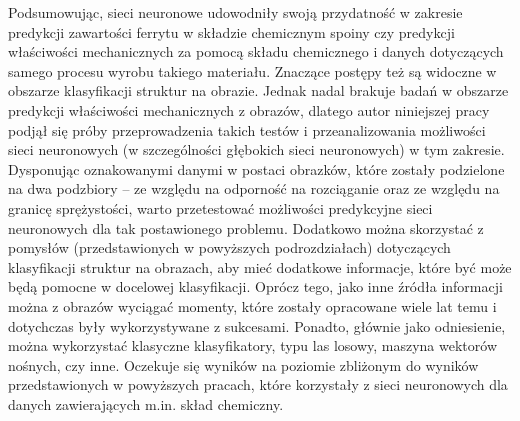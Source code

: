Podsumowując, sieci neuronowe udowodniły swoją przydatność w zakresie predykcji zawartości ferrytu w składzie chemicznym spoiny czy predykcji właściwości mechanicznych za pomocą składu chemicznego i danych dotyczących samego procesu wyrobu takiego materiału. Znaczące postępy też są widoczne w obszarze klasyfikacji struktur na obrazie. Jednak nadal brakuje badań w obszarze predykcji właściwości mechanicznych z obrazów, dlatego autor niniejszej pracy podjął się próby przeprowadzenia takich testów i przeanalizowania możliwości sieci neuronowych (w szczególności głębokich sieci neuronowych) w tym zakresie. Dysponując oznakowanymi danymi w postaci obrazków, które zostały podzielone na dwa podzbiory –  ze względu na odporność na rozciąganie oraz ze względu na granicę sprężystości, warto przetestować możliwości predykcyjne sieci neuronowych dla tak postawionego problemu. Dodatkowo można skorzystać z pomysłów (przedstawionych w powyższych podrozdziałach) dotyczących klasyfikacji struktur na obrazach, aby mieć dodatkowe informacje, które być może będą pomocne w docelowej klasyfikacji. Oprócz tego, jako inne źródła informacji można z obrazów wyciągać momenty, które zostały opracowane wiele lat temu i dotychczas były wykorzystywane z sukcesami. Ponadto, głównie jako odniesienie, można wykorzystać klasyczne klasyfikatory, typu las losowy, maszyna wektorów nośnych, czy inne. Oczekuje się wyników na poziomie zbliżonym do wyników przedstawionych w powyższych pracach, które korzystały z sieci neuronowych dla danych zawierających m.in. skład chemiczny.  







